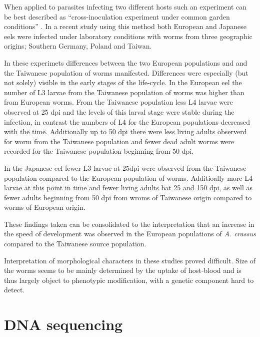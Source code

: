 When applied to parasites infecting two different hosts such an
experiment can be best described as ``cross-inoculation experiment
under common garden conditions'' \cite{kaltz_shykoff_rev}. In a recent
study using this method both European and Japanese eels were infected
under laboratory conditions with worms from three geographic origins;
Southern Germany, Poland and Taiwan.

In these experimets differences between the two European populations
and and the Taiwanese population of worms manifested. Differences were
especially (but not solely) visible in the early stages of the
life-cycle. In the European eel the number of L3 larvae from
the Taiwanese population of worms was higher than from European
worms. From the Taiwanese population less L4 larvae were
observed at 25 dpi and the levels of this larval stage were stable
during the infection, in contrast the numbers of L4 for the European
populations decreased with the time. Additionally up to 50 dpi there
were less living adults observerd for worm from the Taiwanese
population and fewer dead adult worms were recorded for the
Taiwanese population beginning from 50 dpi.

In the Japanese eel fewer L3 larvae at 25dpi were observed from the
Taiwanese population compared to the European population of
worms. Additioally more L4 larvae at this point in time and fewer
living adults bat 25 and 150 dpi, as well as fewer adults beginning
from 50 dpi from wroms of Taiwanese origin compared to worms of
European origin.


These findings taken can be consolidated to the interpretation that an
increase in the speed of development was observed in the European
populations of \textit{A. crassus} compared to the Taiwanese source
population.

Interpretation of morphological characters in these studies proved
difficult. Size of the worms seems to be mainly determined by the
uptake of host-blood and is thus largely object to phenotypic
modification, with a genetic component hard to detect.

\section{DNA sequencing}


